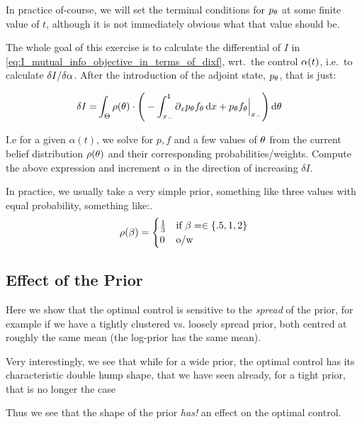 \documentclass{article}
\begin{document}
In practice of-course, we will set the terminal conditions for $p_{\theta}$ at some
finite value of $t$, although it is not immediately obvious what that
value should be.

\vskip10pt The whole goal of this exercise is to calculate the differential of
$I$ in \cref{eq:I_mutual_info_objective_in_terms_of_dixf},
wrt.\ the control ${\alpha}(t)$, i.e.\ to calculate $\delta I / \delta {\alpha}$. After the
introduction of the adjoint state, $p_{\theta}$, that is just:

 
\begin{align*}
\delta I =&   
\int_\Theta  \rho({\theta}) \cdot \Bigg(  
- \int_{ x_{-} }^{1} {\partial}_x p_{\theta} f_{\theta} \, \mathrm{d} x + 
   p_{\theta} f_{\theta} \Big|_{ x_{-} } 
    \Bigg) \, \mathrm{d} {\theta}
\end{align*}

I.e for a given $\alpha(t)$, we solve for $p,f$ and a few values of ${\theta}$ from
the current belief distribution $\rho({\theta})$ and their corresponding
probabilities/weights. Compute the above expression and increment $\alpha$ in
the direction of increasing $\delta I$.

In practice, we usually take a very simple prior, something like three values
with equal probability, something like:.
\begin{equation}
\rho({\beta}) = 
\begin{cases}
	\tfrac 13 & \textrm{if } {\beta}= \in \{.5,    1 ,  2 \}\\
	0   &\textrm{o/w }
\end{cases}
\label{eq:basic_prior_over_tau}
\end{equation} 

\subsection{Effect of the Prior}

Here we show that the optimal control is sensitive to the {\sl spread} of the
prior, for example if we have a tightly clustered vs. loosely spread prior, both
centred at roughly the same mean (the log-prior has the same mean). 

Very interestingly, we see that while for a wide prior, the optimal control has
its characteristic double hump shape, that we have seen already, for a tight
prior, that is no longer the case

Thus we see that the shape of the prior {\sl has!}
an effect on the optimal control.
\end{document}
